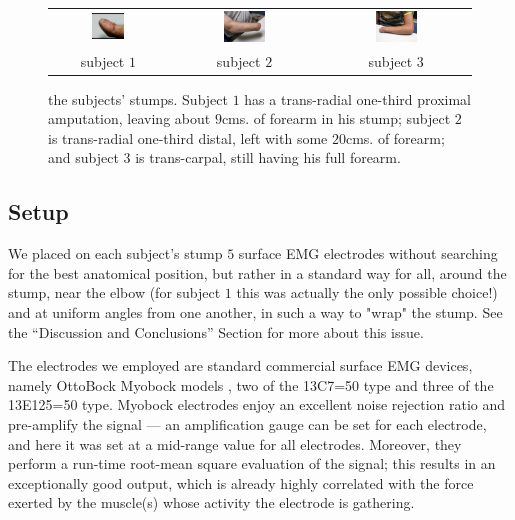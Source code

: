 \begin{figure}[!ht] \centering
  \begin{tabular}{ccc}
    \includegraphics[width=0.3\textwidth]{figs/stump_1} &
    \includegraphics[width=0.3\textwidth]{figs/stump_2} &
    \includegraphics[width=0.3\textwidth]{figs/stump_3} \\
    subject $1$ & subject $2$ & subject $3$ \\
  \end{tabular}
  \caption{the subjects' stumps. Subject $1$ has a trans-radial
    one-third proximal amputation, leaving about $9$cms. of forearm in his
    stump; subject $2$ is trans-radial one-third distal, left with some
    $20$cms. of forearm; and subject $3$ is trans-carpal, still having his
    full forearm.}
  \label{fig:stumps}
\end{figure}

\subsection{Setup}

We placed on each subject's stump $5$ surface EMG electrodes without
searching for the best anatomical position, but rather in a standard
way for all, around the stump, near the elbow (for subject $1$ this
was actually the only possible choice!) and at uniform angles from one
another, in such a way to "wrap" the stump. See the ``Discussion and
Conclusions'' Section for more about this issue.

The electrodes we employed are standard commercial surface EMG
devices, namely OttoBock Myobock models \cite{ottobock}, two of the
13C7=50 type and three of the 13E125=50 type. Myobock electrodes enjoy
an excellent noise rejection ratio and pre-amplify the signal --- an
amplification gauge can be set for each electrode, and here it was set
at a mid-range value for all electrodes. Moreover, they perform a
run-time root-mean square evaluation of the signal; this results in an
exceptionally good output, which is already highly correlated with the
force exerted by the muscle(s) whose activity the electrode is
gathering.

